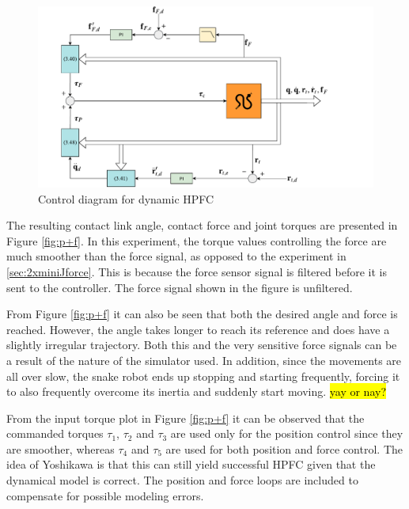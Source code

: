 \begin{figure}
    \centering
    \includegraphics[trim=1cm 0cm 3cm 0cm, clip=true, width=\textwidth]{figures/experiments/control-diagrams/pf-control-diagram.pdf}
    \caption{Control diagram for dynamic HPFC}
    \label{fig:diag-pf}
\end{figure}

The resulting contact link angle, contact force and joint torques are presented in Figure \ref{fig:p+f}. In this experiment, the torque values controlling the force are much smoother than the force signal, as opposed to the experiment in \ref{sec:2xminiJforce}. This is because the force sensor signal is filtered before it is sent to the controller. The force signal shown in the figure is unfiltered.

From Figure \ref{fig:p+f} it can also be seen that both the desired angle and force is reached. However, the angle takes longer to reach its reference and does have a slightly irregular trajectory. Both this and the very sensitive force signals can be a result of the nature of the simulator used. In addition, since the movements are all over slow, the snake robot ends up stopping and starting frequently, forcing it to also frequently overcome its inertia and suddenly start moving. \hl{yay or nay?}

From the input torque plot in Figure \ref{fig:p+f} it can be observed that the commanded torques $\tau_1$, $\tau_2$ and $\tau_3$ are used only for the position control since they are smoother, whereas $\tau_4$ and $\tau_5$ are used for both position and force control. The idea of Yoshikawa \cite{yoshikawa1987dynamic} is that this can still yield successful HPFC given that the dynamical model is correct. The position and force loops are included to compensate for possible modeling errors.

